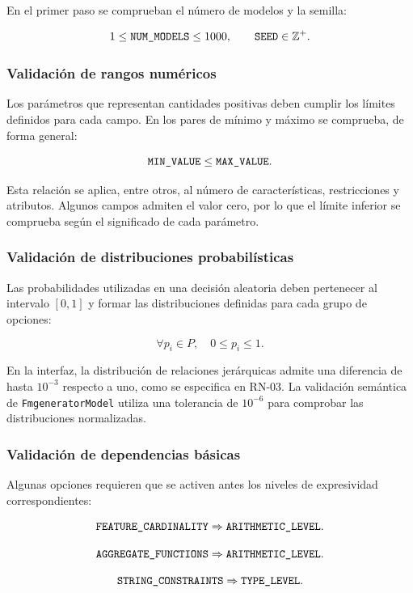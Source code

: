 En el primer paso se comprueban el número de modelos y la semilla:

\[
1 \leq \text{\texttt{NUM\_MODELS}} \leq 1000,
\qquad
\text{\texttt{SEED}} \in \mathbb{Z}^{+}.
\]

\subsubsection*{Validación de rangos numéricos}

Los parámetros que representan cantidades positivas deben cumplir los
límites definidos para cada campo. En los pares de mínimo y máximo se
comprueba, de forma general:

\[
\text{\texttt{MIN\_VALUE}} \leq \text{\texttt{MAX\_VALUE}}.
\]

Esta relación se aplica, entre otros, al número de características,
restricciones y atributos. Algunos campos admiten el valor cero, por lo que
el límite inferior se comprueba según el significado de cada parámetro.

\subsubsection*{Validación de distribuciones probabilísticas}

Las probabilidades utilizadas en una decisión aleatoria deben pertenecer al
intervalo $[0,1]$ y formar las distribuciones definidas para cada grupo de
opciones:

\[
\forall p_i\in P,\quad 0\leq p_i\leq 1.
\]

En la interfaz, la distribución de relaciones jerárquicas admite una
diferencia de hasta $10^{-3}$ respecto a uno, como se especifica en RN-03.
La validación semántica de \texttt{FmgeneratorModel} utiliza una tolerancia
de $10^{-6}$ para comprobar las distribuciones normalizadas.

\subsubsection*{Validación de dependencias básicas}

Algunas opciones requieren que se activen antes los niveles de expresividad
correspondientes:

\[
\text{\texttt{FEATURE\_CARDINALITY}}
\Rightarrow \text{\texttt{ARITHMETIC\_LEVEL}}.
\]

\[
\text{\texttt{AGGREGATE\_FUNCTIONS}}
\Rightarrow \text{\texttt{ARITHMETIC\_LEVEL}}.
\]

\[
\text{\texttt{STRING\_CONSTRAINTS}}
\Rightarrow \text{\texttt{TYPE\_LEVEL}}.
\]

